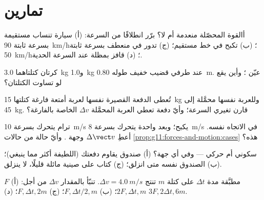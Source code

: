 \section{تمارين}

\begin{exercise}[$\star$]\label{exo:g11:forces-and-motion:1}
أالقوة المحصّلة منعدمة أم لا؟ برّر انطلاقًا من السرعة: (أ) سيارة تنساب
مستقيمة بسرعة ثابتة \qty{90}{km/h}؛ (ب) تكبح في خط مستقيم؛
(ج) تدور في منعطف بسرعة ثابتة \qty{50}{km/h}؛ (د) قافز بمظلة عند
السرعة الحدية.
\end{exercise}

\begin{exercise}[$\star$]\label{exo:g11:forces-and-motion:2}
كرتان كتلتاهما \qty{3.0}{kg} و\qty{1.0}{kg} عند طرفي قضيب خفيف
طوله \qty{0.80}{m}. عيّن ؛ وأين يقع لو تساوت الكتلتان؟
\end{exercise}

\begin{exercise}[$\star$]\label{exo:g11:forces-and-motion:3}
تُعطى الدفعة القصيرة نفسها لعربة أمتعة فارغة كتلتها \qty{15}{kg}
وللعربة نفسها محمَّلة إلى \qty{45}{kg}. قارن تغيري
السرعة؛ وأيّ دفعة تعطي العربة المحمَّلة $\Delta v$ الخاصة بالفارغة؟
\end{exercise}

\begin{exercise}[$\star$]\label{exo:g11:forces-and-motion:4}
ترام يتحرك بسرعة \qty{10}{m/s} يكبح؛ وبعد  واحدة يتحرك بسرعة
\qty{8}{m/s} في الاتجاه نفسه. أعطِ $\Delta \vect v$ وجهة
. وأيّ حالة من حالات \cref{prop:g11:forces-and-motion:cases} هذه؟
\end{exercise}

\begin{exercise}[$\star$]\label{exo:g11:forces-and-motion:5}
 سكوني أم حركي --- وفي أي جهة؟ (أ) صندوق يقاوم
دفعتك (اللطيفة أكثر مما ينبغي)؛ (ب) الصندوق نفسه متى انزلق؛
(ج) كتاب على صينية مائلة قليلًا، لا ينزلق.
\end{exercise}

\begin{exercise}[$\star\star$]\label{exo:g11:forces-and-motion:6}
 $F$ مطبَّقة مدة $\Delta t$ على كتلة $m$ تنتج
$\Delta v = \qty{4.0}{m/s}$. تنبّأ بالمقدار $\Delta v$ من أجل: (أ) $2F, \Delta t, m$؛
(ب) $F, \Delta t/2, m$؛ (ج) $F, \Delta t, 2m$؛ (د) $3F, 2\Delta t, 6m$.
\end{exercise}

